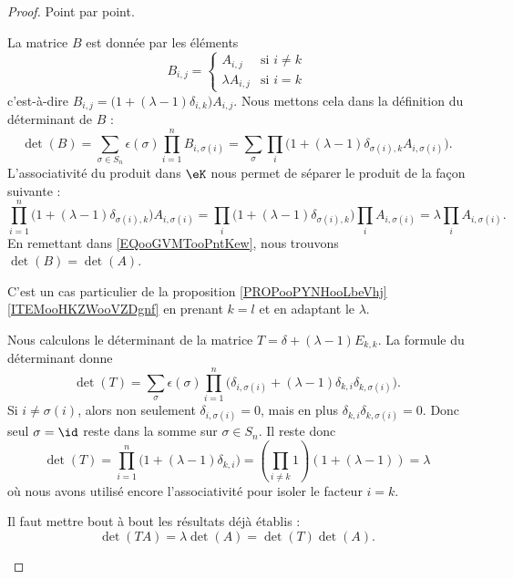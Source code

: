 \begin{proof}
	Point par point.
	\begin{subproof}
		\spitem[\ref{ITEMooBKIGooCDQEDt}]
		La matrice \( B\) est donnée par les éléments
		\begin{equation}
			B_{i,j}=\begin{cases}
				A_{i,j}         & \text{si } i\neq k        \\
				\lambda A_{i,j} & \text{si } i=k
			\end{cases}
		\end{equation}
		c'est-à-dire \( B_{i,j}=\big( 1+(\lambda-1)\delta_{i,k} \big)A_{i,j}\). Nous mettons cela dans la définition du déterminant de \( B\) :
		\begin{equation}        \label{EQooGVMTooPntKew}
			\det(B)=\sum_{\sigma\in S_n}\epsilon(\sigma)\prod_{i=1}^n B_{i,\sigma(i)}=\sum_{\sigma}\prod_i\big( 1+(\lambda-1)\delta_{\sigma(i),k}A_{i,\sigma(i)} \big).
		\end{equation}
		L'associativité du produit dans \( \eK\) nous permet de séparer le produit de la façon suivante :
		\begin{equation}
			\prod_{i=1}^n\big( 1+(\lambda-1)\delta_{\sigma(i),k} \big)A_{i,\sigma(i)}=\prod_i\big( 1+(\lambda-1)\delta_{\sigma(i),k} \big)\prod_i A_{i,\sigma(i)}=\lambda\prod_i A_{i,\sigma(i)}.
		\end{equation}
		En remettant dans \eqref{EQooGVMTooPntKew}, nous trouvons \( \det(B)=\det(A)\).

		\spitem[\ref{ITEMooWRRCooFXkRNW}]
		C'est un cas particulier de la proposition \ref{PROPooPYNHooLbeVhj}\ref{ITEMooHKZWooVZDgnf} en prenant \( k=l\) et en adaptant le \( \lambda\).

		\spitem[\ref{ITEMooOGGDooPVVRzk}]
		Nous calculons le déterminant de la matrice \( T=\delta+(\lambda-1)E_{k,k}\). La formule du déterminant donne
		\begin{equation}
			\det(T)=\sum_{\sigma}\epsilon(\sigma)\prod_{i=1}^n\big( \delta_{i,\sigma(i)}+(\lambda-1)\delta_{k,i}\delta_{k,\sigma(i)} \big).
		\end{equation}
		Si \( i\neq \sigma(i)\), alors non seulement \( \delta_{i,\sigma(i)}=0\), mais en plus \( \delta_{k,i}\delta_{k,\sigma(i)}=0\). Donc seul \( \sigma=\id\) reste dans la somme sur \( \sigma\in S_n\). Il reste donc
		\begin{equation}
			\det(T)=\prod_{i=1}^n\big( 1+(\lambda-1)\delta_{k,i} \big)=\left( \prod_{i\neq k}1 \right)(1+(\lambda-1))=\lambda
		\end{equation}
		où nous avons utilisé encore l'associativité pour isoler le facteur \( i=k\).

		\spitem[\ref{ITEMooIFRVooWQYgkK}]
		Il faut mettre bout à bout les résultats déjà établis :
		\begin{equation}
			\det(TA)=\lambda\det(A)=\det(T)\det(A).
		\end{equation}
	\end{subproof}
\end{proof}

